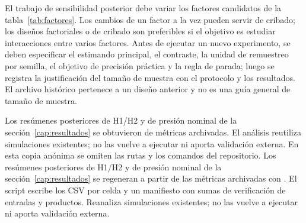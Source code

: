 El trabajo de sensibilidad posterior debe variar los factores candidatos de la tabla~\ref{tab:factores}. Los cambios de un factor a la vez pueden servir de cribado; los diseños factoriales o de cribado \cite{morris1991factorial,saltelli2010variance} son preferibles si el objetivo es estudiar interacciones entre varios factores. Antes de ejecutar un nuevo experimento, se deben especificar el estimando principal, el contraste, la unidad de remuestreo por semilla, el objetivo de precisión práctica y la regla de parada; luego se registra la justificación del tamaño de muestra con el protocolo y los resultados. El archivo histórico  pertenece a un diseño anterior y no es una guía general de tamaño de muestra.

\ifdefined\blindreviewmode
Los resúmenes posteriores de H1/H2 y de presión nominal de la sección~\ref{cap:resultados} se obtuvieron de métricas archivadas. El análisis reutiliza simulaciones existentes; no las vuelve a ejecutar ni aporta validación externa. En esta copia anónima se omiten las rutas y los comandos del repositorio.
\else
Los resúmenes posteriores de H1/H2 y de presión nominal de la sección~\ref{cap:resultados} se regeneran a partir de las métricas archivadas con . El script escribe los CSV por celda y un manifiesto con sumas de verificación de entradas y productos. Reanaliza simulaciones existentes; no las vuelve a ejecutar ni aporta validación externa.
\fi
